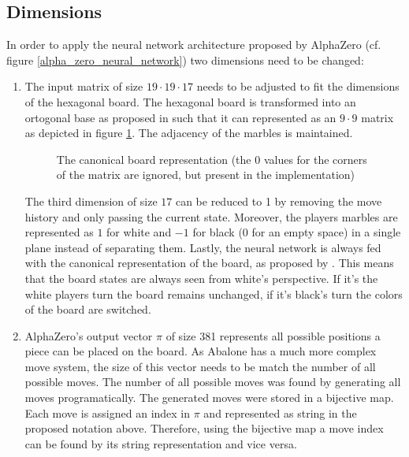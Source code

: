 \subsection{Dimensions}
In order to apply the neural network architecture proposed by AlphaZero (cf. figure \ref{alpha_zero_neural_network}) two dimensions need to be changed:
\begin{enumerate}
    \item The input matrix of size $19 \cdot 19 \cdot 17$ needs to be adjusted to fit the dimensions of the hexagonal board. The hexagonal board is transformed into an ortogonal base as proposed in \cite{towzeur_towzeurgym-abalone_2021} such that it can represented as an $9 \cdot 9$ matrix as depicted in figure \ref{input_matrix}. The adjacency of the marbles is maintained.
          \begin{figure}[!h]
              \centering
              \hfill
              \caption{The canonical board representation (the $0$ values for the corners of the matrix are ignored, but present in the implementation)}
              \label{input_matrix}
          \end{figure}
          The third dimension of size $17$ can be reduced to 1 by removing the move history and only passing the current state. Moreover, the players marbles are represented as $1$ for white and $-1$ for black (0 for an empty space) in a single plane instead of separating them. Lastly, the neural network is always fed with the canonical representation of the board, as proposed by \cite{thakoor_learning_nodate}. This means that the board states are always seen from white's perspective. If it's the white players turn the board remains unchanged, if it's black's turn the colors of the board are switched.

    \item AlphaZero's output vector $\pi$ of size 381 represents all possible positions a piece can be placed on the board. As Abalone has a much more complex move system, the size of this vector needs to be match the number of all possible moves. The number of all possible moves was found by generating all moves programatically. The generated moves were stored in a bijective map. Each move is assigned an index in $\pi$ and represented as string in the proposed notation above. Therefore, using the bijective map a move index can be found by its string representation and vice versa.


\end{enumerate}
